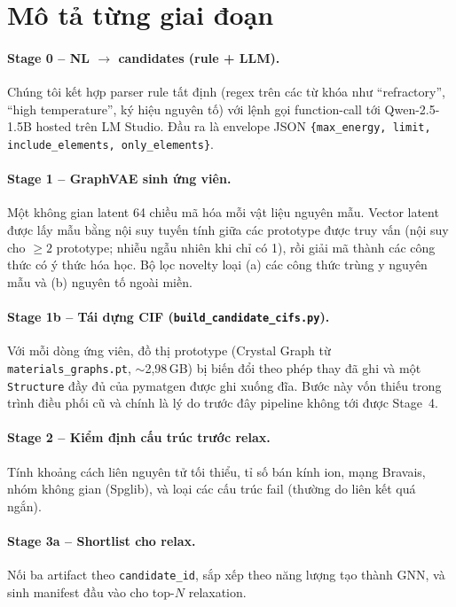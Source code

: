 \documentclass[11pt,a4paper]{report}
\begin{document}
\section{Mô tả từng giai đoạn}

\paragraph{Stage 0 -- NL $\to$ candidates (rule + LLM).}
Chúng tôi kết hợp parser rule tất định (regex trên các từ khóa như ``refractory'', ``high
temperature'', ký hiệu nguyên tố) với lệnh gọi function-call tới Qwen-2.5-1.5B hosted trên
LM Studio. Đầu ra là envelope JSON \texttt{\{max\_energy, limit, include\_elements, only\_elements\}}.

\paragraph{Stage 1 -- GraphVAE sinh ứng viên.}
Một không gian latent 64 chiều mã hóa mỗi vật liệu nguyên mẫu. Vector latent được lấy mẫu
bằng nội suy tuyến tính giữa các prototype được truy vấn (nội suy cho $\geq 2$ prototype;
nhiễu ngẫu nhiên khi chỉ có 1), rồi giải mã thành các công thức có ý thức hóa học. Bộ lọc
novelty loại (a) các công thức trùng y nguyên mẫu và (b) nguyên tố ngoài miền.

\paragraph{Stage 1b -- Tái dựng CIF (\texttt{build\_candidate\_cifs.py}).}
Với mỗi dòng ứng viên, đồ thị prototype (Crystal Graph từ
\texttt{materials\_graphs.pt}, $\sim$2{,}98\,GB) bị biến đổi theo phép thay đã ghi và một
\texttt{Structure} đầy đủ của pymatgen được ghi xuống đĩa. Bước này vốn thiếu trong trình
điều phối cũ và chính là lý do trước đây pipeline không tới được Stage~4.

\paragraph{Stage 2 -- Kiểm định cấu trúc trước relax.}
Tính khoảng cách liên nguyên tử tối thiểu, tỉ số bán kính ion, mạng Bravais, nhóm không
gian (Spglib), và loại các cấu trúc fail (thường do liên kết quá ngắn).

\paragraph{Stage 3a -- Shortlist cho relax.}
Nối ba artifact theo \texttt{candidate\_id}, sắp xếp theo năng lượng tạo thành GNN, và
sinh manifest đầu vào cho top-$N$ relaxation.
\end{document}
